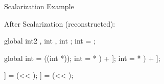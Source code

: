 \begin{frame}[fragile]{Scalarization Example}
\begin{minipage}[t]{0.49\linewidth}
\vspace{0.1ex}
After Scalarization (reconstructed):
\begin{codebox}[commandchars=\\\[\]]
global int2 \uniform[*src], int \uniform[*left], int \uniform[*right];
int \varying[tid] = ;

global int \uniform[*srcScalar] = ((int *)\uniform[src]);
int \varying[sampleLeft] = \uniform[srcScalar]\idx[(\varying[tid] * \uniform[2]) + \uniform[0]];
int \varying[sampleRight] = \uniform[srcScalar]\idx[(\varying[tid] * \uniform[2]) + \uniform[1]];

\uniform[left]\idx[\varying[tid]] = (\varying[sampleLeft] << \uniform[1]);
\uniform[right]\idx[\varying[tid]] = (\varying[sampleRight] << \uniform[1]);
\end{codebox}

\end{minipage}

\end{frame}


%
%
%
